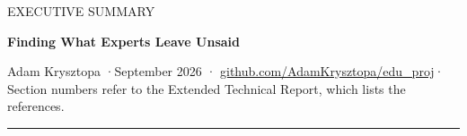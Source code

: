 \documentclass[a4paper,11pt]{scrartcl}
\makeatletter
\newcommand{\skipsummaryheading}{%
  \let\orig@section\section
  \renewcommand{\section}[2]{\let\section\orig@section}}
\makeatother
\begin{document}
\thispagestyle{plain.scrheadings}
\pagestyle{scrheadings}

{\sffamily
  {\small\color{gray700}\MakeUppercase{Executive summary}\par}
  \vspace{2mm}
  {\bfseries\fontsize{20}{24}\selectfont\color{ink}Finding What Experts Leave Unsaid\par}
  \vspace{1mm}
  {\small\color{gray700}Adam Krysztopa \enspace·\enspace September 2026 \enspace·\enspace
    \href{https://github.com/AdamKrysztopa/edu_proj}{github.com/AdamKrysztopa/edu\_proj}\enspace·\enspace
    Section numbers refer to the Extended Technical Report, which lists the references.\par}
  \vspace{1mm}
  \textcolor{accent}{\rule{\linewidth}{1pt}}\par}
\vspace{2mm}

\skipsummaryheading

\end{document}
